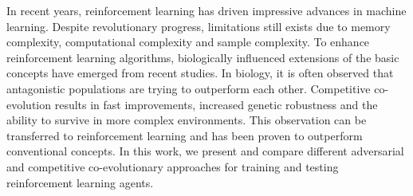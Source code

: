 In recent years, reinforcement learning has driven impressive advances in machine learning. Despite revolutionary progress, limitations still exists due to memory complexity, computational complexity and sample complexity. To enhance reinforcement learning algorithms, biologically influenced extensions of the basic concepts have emerged from recent studies. In biology, it is often observed that antagonistic populations are trying to outperform each other. Competitive co-evolution results in fast improvements, increased genetic robustness and the ability to survive in more complex environments. This observation can be transferred to reinforcement learning and has been proven to outperform conventional concepts. In this work, we present and compare different adversarial and competitive co-evolutionary approaches for training and testing reinforcement learning agents.